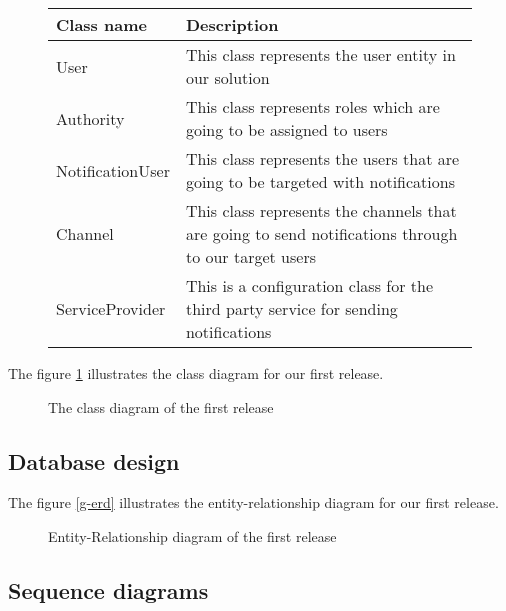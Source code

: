 \begin{figure}[hbt!]
    \begin{tabular}{ | m{} | m{} | }
        \hline
        \textbf{Class name} & \textbf{Description}                                                                                \\
        \hline
        User                & This class represents the user entity in our solution                                               \\
        \hline
        Authority           & This class represents roles which are going to be assigned to users                                 \\
        \hline
        NotificationUser    & This class represents the users that are going to be targeted with notifications                    \\
        \hline
        Channel             & This class represents the channels that are going to send notifications through to our target users \\
        \hline
        ServiceProvider     & This is a configuration class for the third party service for sending notifications                 \\
        \hline
    \end{tabular}
\end{figure}


The figure \ref{g-class} illustrates the class diagram for our first release.

\begin{figure}[hbt!]
    \centering
    
    \caption{The class diagram of the first release}
    \label{g-class}
\end{figure}

\subsection{Database design}
The figure \ref{g-erd}  illustrates the entity-relationship diagram for our first release.

\begin{figure}[hbt!]
    \centering
    
    \caption{Entity-Relationship diagram of the first release}
    \label{r1-erd}
\end{figure}


\subsection{Sequence diagrams}
